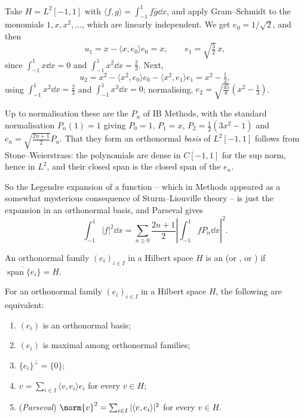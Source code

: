 \documentclass[a4paper]{scrartcl}
\newcommand{\ip}[2]{\langle #1, #2 \rangle}
\newcommand{\spn}{\operatorname{span}}
\begin{document}
\begin{example}
	Take $H = L^2[-1,1]$ with $\ip{f}{g}=\int_{-1}^1 f\bar g\dd x$, and apply Gram--Schmidt to the monomials $1, x, x^2, \dots$, which are linearly independent. We get $e_0 = 1/\sqrt2$, and then
	$$u_1 = x - \ip{x}{e_0}e_0 = x, \qquad e_1 = \sqrt{\tfrac32}\,x,$$
	since $\int_{-1}^1 x \dd x = 0$ and $\int_{-1}^1x^2\dd x = \frac23$. Next,
	$$u_2 = x^2 - \ip{x^2}{e_0}e_0 - \ip{x^2}{e_1}e_1 = x^2 - \tfrac13,$$
	using $\int_{-1}^1x^2\dd x = \frac23$ and $\int_{-1}^1 x^3\dd x = 0$; normalising, $e_2 = \sqrt{\frac{45}{8}}(x^2-\frac13)$.

	Up to normalisation these are the  $P_n$ of IB Methods, with the standard normalisation $P_n(1)=1$ giving $P_0=1$, $P_1=x$, $P_2 = \frac12(3x^2-1)$ and $e_n = \sqrt{\frac{2n+1}{2}}P_n$. That they form an orthonormal \emph{basis} of $L^2[-1,1]$ follows from Stone--Weierstrass: the polynomials are dense in $C[-1,1]$ for the sup norm, hence in $L^2$, and their closed span is the closed span of the $e_n$.

	So the Legendre expansion of a function -- which in Methods appeared as a somewhat mysterious consequence of Sturm--Liouville theory -- is just the expansion in an orthonormal basis, and Parseval gives
	$$\int_{-1}^1|f|^2\dd x = \sum_{n\geq0}\frac{2n+1}{2}\left|\int_{-1}^1 f P_n \dd x\right|^2.$$
\end{example}

\begin{definition}
	An orthonormal family $(e_i)_{i \in I}$ in a Hilbert space $H$ is an  (or , or ) if $\overline{\spn\{e_i\}} = H$.
\end{definition}

\begin{proposition}
	For an orthonormal family $(e_i)_{i\in I}$ in a Hilbert space $H$, the following are equivalent:
	\begin{enumerate}[label=(\roman*)]
		\item $(e_i)$ is an orthonormal basis;
		\item $(e_i)$ is maximal among orthonormal families;
		\item $\{e_i\}^\perp = \{0\}$;
		\item $v = \sum_{i \in I}\ip{v}{e_i}e_i$ for every $v \in H$;
		\item (\emph{Parseval}) $\norm{v}^2 = \sum_{i \in I}|\ip{v}{e_i}|^2$ for every $v \in H$.
	\end{enumerate}
\end{proposition}
\end{document}
